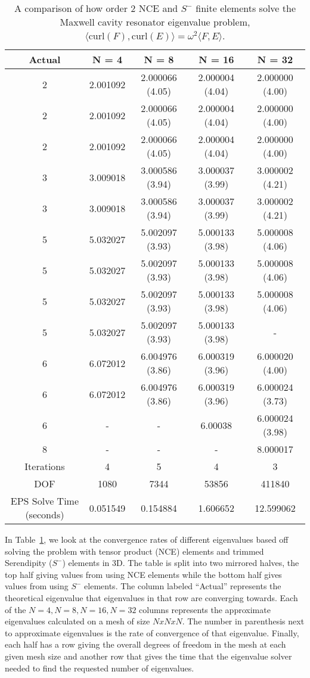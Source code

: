 \documentclass[manuscript,screen]{acmart}
\begin{document}
\begin{center}
\begin{table}
\begin{tabular}{ c c c c c }
Actual & N = 4 & N = 8 & N = 16 & N = 32 \\ 
\hline
2 &2.001092 & 2.000066 (4.05) & 2.000004 (4.04) & 2.000000 (4.00) \\  
2 & 2.001092 & 2.000066 (4.05) & 2.000004 (4.04) & 2.000000 (4.00)  \\
2 & 2.001092 & 2.000066 (4.05) & 2.000004 (4.04) & 2.000000 (4.00)\\
3 & 3.009018 & 3.000586 (3.94) & 3.000037 (3.99) & 3.000002 (4.21) \\
3 & 3.009018 & 3.000586 (3.94) & 3.000037 (3.99) & 3.000002 (4.21) \\
5 & 5.032027 & 5.002097 (3.93)& 5.000133 (3.98) & 5.000008 (4.06) \\
5 & 5.032027 & 5.002097 (3.93)& 5.000133 (3.98) & 5.000008 (4.06) \\
5 & 5.032027 & 5.002097 (3.93) & 5.000133 (3.98) & 5.000008 (4.06) \\
5 & 5.032027 & 5.002097 (3.93) & 5.000133 (3.98) & - \\
6 & 6.072012 & 6.004976 (3.86) & 6.000319 (3.96) & 6.000020 (4.00) \\
6 & 6.072012 & 6.004976 (3.86) & 6.000319 (3.96) & 6.000024 (3.73)\\
6 & - & - & 6.00038 & 6.000024 (3.98)\\
8 & - & - & - & 8.000017 \\
\hline
Iterations & 4 & 5 & 4 & 3 \\
\hline
DOF  & 1080 & 7344 & 53856 & 411840 \\
\hline
EPS Solve Time (seconds) & 0.051549 & 0.154884 & 1.606652 & 12.599062 \\
\hline

\end{tabular}
\caption{A comparison of how order 2 NCE and $S^-$ finite elements solve the Maxwell cavity resonator eigenvalue problem, $\langle \text{curl}(F), \text{curl}(E) \rangle = \omega^2 \langle F, E \rangle$. }  
\label{tab:Eigenvalue}
\end{table}
\end{center}

In Table~\ref{tab:Eigenvalue}, we look at the convergence rates of different eigenvalues based off solving the problem with tensor product (NCE) elements and trimmed Serendipity ($S^-$) elements in 3D.  The table is split into two mirrored halves, the top half giving values from using NCE elements while the bottom half gives values from using $S^-$ elements.  The column labeled ``Actual'' represents the theoretical eigenvalue that eigenvalues in that row are converging towards.  Each of the $N=4, N=8, N=16, N=32$ columns represents the approximate eigenvalues calculated on a mesh of size $N x N x N$.  The number in parenthesis next to approximate eigenvalues is the rate of convergence of that eigenvalue.  Finally, each half has a row giving the overall degrees of freedom in the mesh at each given mesh size and another row that gives the time that the eigenvalue solver needed to find the requested number of eigenvalues.
\end{document}
